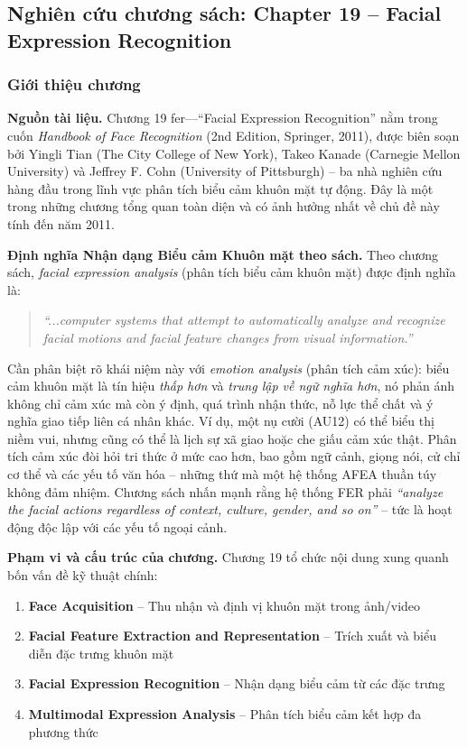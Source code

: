 \documentclass[12pt,a4paper]{article}
\let\oldtextbf\textbf
\renewcommand{\textbf}[1]{\oldtextbf{\textcolor{hcmublue}{#1}}}
\begin{document}
\subsection{Nghiên cứu chương sách: Chapter 19 -- Facial Expression Recognition}

\subsubsection{Giới thiệu chương}

\textbf{Nguồn tài liệu.} Chương 19 \gls{fer}---``Facial Expression Recognition'' nằm trong cuốn \textit{Handbook of Face Recognition} (2nd Edition, Springer, 2011), được biên soạn bởi Yingli Tian (The City College of New York), Takeo Kanade (Carnegie Mellon University) và Jeffrey F. Cohn (University of Pittsburgh) -- ba nhà nghiên cứu hàng đầu trong lĩnh vực phân tích biểu cảm khuôn mặt tự động. Đây là một trong những chương tổng quan toàn diện và có ảnh hưởng nhất về chủ đề này tính đến năm 2011.

\textbf{Định nghĩa Nhận dạng Biểu cảm Khuôn mặt theo sách.}
Theo chương sách, \textit{facial expression analysis} (phân tích biểu cảm khuôn mặt) được định nghĩa là:

\begin{quote}
\textit{``...computer systems that attempt to automatically analyze and recognize facial motions and facial feature changes from visual information.''}
\end{quote}

Cần phân biệt rõ khái niệm này với \textit{emotion analysis} (phân tích cảm xúc): biểu cảm khuôn mặt là tín hiệu \textit{thấp hơn} và \textit{trung lập về ngữ nghĩa hơn}, nó phản ánh không chỉ cảm xúc mà còn ý định, quá trình nhận thức, nỗ lực thể chất và ý nghĩa giao tiếp liên cá nhân khác. Ví dụ, một nụ cười (AU12) có thể biểu thị niềm vui, nhưng cũng có thể là lịch sự xã giao hoặc che giấu cảm xúc thật. Phân tích cảm xúc đòi hỏi tri thức ở mức cao hơn, bao gồm ngữ cảnh, giọng nói, cử chỉ cơ thể và các yếu tố văn hóa -- những thứ mà một hệ thống AFEA thuần túy không đảm nhiệm. Chương sách nhấn mạnh rằng hệ thống FER phải \textit{``analyze the facial actions regardless of context, culture, gender, and so on''} -- tức là hoạt động độc lập với các yếu tố ngoại cảnh.

\textbf{Phạm vi và cấu trúc của chương.} Chương 19 tổ chức nội dung xung quanh bốn vấn đề kỹ thuật chính:
\begin{enumerate}
    \item \textbf{Face Acquisition} -- Thu nhận và định vị khuôn mặt trong ảnh/video
    \item \textbf{Facial Feature Extraction and Representation} -- Trích xuất và biểu diễn đặc trưng khuôn mặt
    \item \textbf{Facial Expression Recognition} -- Nhận dạng biểu cảm từ các đặc trưng
    \item \textbf{Multimodal Expression Analysis} -- Phân tích biểu cảm kết hợp đa phương thức
\end{enumerate}
\end{document}
